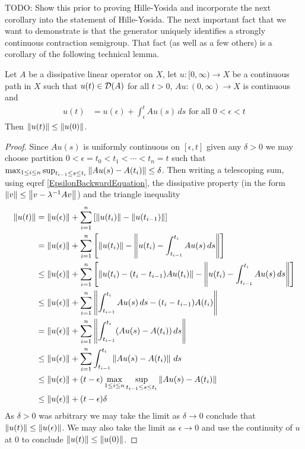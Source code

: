 TODO:  Show this prior to proving Hille-Yosida and incorporate the next corollary into the statement of Hille-Yosida.  
The next important fact that we want to demonstrate is that the generator uniquely identifies a strongly continuous contraction semigroup.  That fact (as well as a few others) is a corollary of the following technical lemma.
\begin{lem}\label{DissipativeContractivePath}Let $A$ be a dissipative linear operator on $X$, let $u : [0,\infty) \to X$ be a continuous path in $X$ such that $u(t) \in \mathcal{D}(A)$ for all $t > 0$, $A u : (0,\infty) \to X$ is continuous and 
\begin{align}\label{EpsilonBackwardEquation}
u(t) &= u(\epsilon) + \int_\epsilon^t A u(s) \, ds \text{ for all $0 < \epsilon < t$}
\end{align}
Then $\left \lVert u(t) \right \rVert \leq \left \lVert u(0) \right \rVert$.
\end{lem}
\begin{proof}
Since $Au(s)$ is uniformly continuous on $[\epsilon, t]$ given any $\delta > 0$ we may choose partition $0< \epsilon=t_0 < t_1 < \dotsb < t_n =t$ such that $\max_{1 \leq i \leq n} \sup_{t_{i-1} \leq s \leq t_i} \left \lVert A u(s) - A(t_i) \right \rVert \leq \delta$.  Then writing a telescoping sum, using eqref \ref{EpsilonBackwardEquation}, the dissipative property (in the form $\left \lVert v \right \rVert \leq \left \lVert v - \lambda^{-1}A v \right \rVert$) and the triangle inequality 
\begin{align*}
\left \lVert u(t) \right \rVert &= \left \lVert u(\epsilon) \right \rVert + \sum_{i=1}^n \left [ \left \lVert u(t_i) \right \rVert - \left \lVert u(t_{i-1}) \right \rVert \right] \\
&=\left \lVert u(\epsilon) \right \rVert + \sum_{i=1}^n \left [ \left \lVert u(t_i) \right \rVert - \left \lVert u(t_i) - \int_{t_{i-1}}^{t_i} A u(s) \, ds \right \rVert \right] \\
&\leq \left \lVert u(\epsilon) \right \rVert + \sum_{i=1}^n \left [ \left \lVert u(t_i) - (t_i - t_{i-1}) A u(t_i)  \right \rVert - \left \lVert u(t_i) - \int_{t_{i-1}}^{t_i} A u(s) \, ds \right \rVert \right] \\
&\leq \left \lVert u(\epsilon) \right \rVert + \sum_{i=1}^n  \left \lVert \int_{t_{i-1}}^{t_i} A u(s) \, ds - (t_i - t_{i-1}) A(t_i) \right \rVert \\
&= \left \lVert u(\epsilon) \right \rVert + \sum_{i=1}^n\left \lVert \int_{t_{i-1}}^{t_i} (A u(s) - A(t_i)) \, ds \right \rVert \\
&\leq \left \lVert u(\epsilon) \right \rVert + \sum_{i=1}^n\int_{t_{i-1}}^{t_i} \left \lVert A u(s) - A(t_i) \right \rVert \, ds \\
&\leq \left \lVert u(\epsilon) \right \rVert + (t - \epsilon) \max_{1 \leq i \leq n} \sup_{t_{i-1} \leq s \leq t_i} \left \lVert A u(s) - A(t_i) \right \rVert  \\
&\leq \left \lVert u(\epsilon) \right \rVert + (t - \epsilon) \delta \\
\end{align*}
As $\delta>0$ was arbitrary we may take the limit as $\delta \to 0$ conclude that $\left \lVert u(t) \right \rVert \leq \left \lVert u(\epsilon) \right \rVert$.  We may also take the limit as $\epsilon \to 0$ and use the continuity of $u$ at $0$ to conclude $\left \lVert u(t) \right \rVert \leq \left \lVert u(0) \right \rVert$.
\end{proof}


